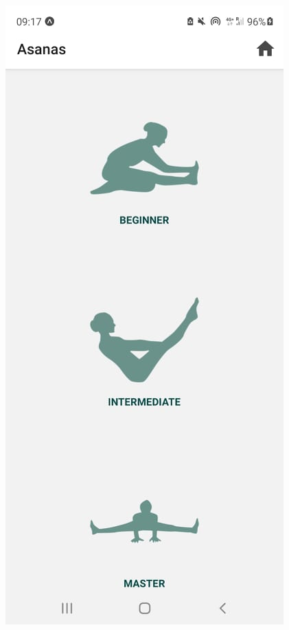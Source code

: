 \documentclass[a4paper, 12pt]{book}
\begin{document}
\begin{figure}[ht]
\centering
\begin{minipage}[b]{0.305\textwidth}
    \includegraphics[width=\textwidth]{podmeniasanas.jpg}\centering

\end{minipage}
\end{figure}
\end{document}
